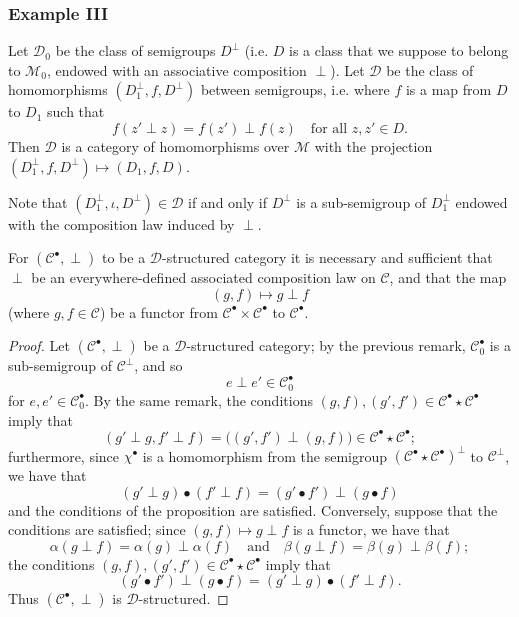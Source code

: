 \documentclass[a4paper,fleqn]{article}
\theoremstyle{plain}
\newenvironment{proposition}[1]
  {\renewcommand\theinnerproposition{#1}\innerproposition}
  {\endinnerproposition}
\theoremstyle{definition}
\newcommand{\textand}{\quad\text{and}\quad}
\newcommand{\CC}{\mathcal{C}}
\newcommand{\MM}{\mathcal{M}}
\newcommand{\DD}{\mathcal{D}}
\newcommand{\smallbullet}{\bullet}
\begin{document}
\subsubsection*{Example III}
\label{section:ii.3.iii}

Let $\DD_0$ be the class of semigroups $D^\perp$ (i.e. $D$ is a class that we suppose to belong to $\MM_0$, endowed with an associative composition $\perp$).
Let $\DD$ be the class of homomorphisms $(D_1^\perp,f,D^\perp)$ between semigroups, i.e. where $f$ is a map from $D$ to $D_1$ such that
\[
  f(z'\perp z)
  = f(z')\perp f(z)
  \quad\text{for all $z,z'\in D$.}
\]
Then $\DD$ is a category of homomorphisms over $\MM$ with the projection $(D_1^\perp,f,D^\perp)\mapsto(D_1,f,D)$.

Note that $(D_1^\perp,\iota,D^\perp)\in\DD$ if and only if $D^\perp$ is a sub-semigroup of $D_1^\perp$ endowed with the composition law induced by $\perp$.

\begin{proposition}{7}
\label{proposition:ii-7}
  For $(\CC^\smallbullet,\perp)$ to be a $\DD$-structured category it is necessary and sufficient that $\perp$ be an everywhere-defined associated composition law on $\CC$, and that the map
  \[
    (g,f)
    \longmapsto g\perp f
  \]
  (where $g,f\in\CC$) be a functor from $\CC^\smallbullet\times\CC^\smallbullet$ to $\CC^\smallbullet$.
\end{proposition}

\begin{proof}
  Let $(\CC^\smallbullet,\perp)$ be a $\DD$-structured category;
  by the previous remark, $\CC_0^\smallbullet$ is a sub-semigroup of $\CC^\perp$, and so
  \[
    e\perp e'
    \in\CC_0^\smallbullet
  \]
  for $e,e'\in\CC_0^\smallbullet$.
  By the same remark, the conditions $(g,f),(g',f')\in\CC^\smallbullet\star\CC^\smallbullet$ imply that
  \[
    (g'\perp g,f'\perp f)
    = \big(
      (g',f')\perp(g,f)
    \big)
    \in\CC^\smallbullet\star\CC^\smallbullet;
  \]
  furthermore, since $\chi^\smallbullet$ is a homomorphism from the semigroup $(\CC^\smallbullet\star\CC^\smallbullet)^\perp$ to $\CC^\perp$, we have that
  \[
    (g'\perp g)\smallbullet(f'\perp f)
    = (g'\smallbullet f')\perp(g\smallbullet f)
  \]
  and the conditions of the proposition are satisfied.
  Conversely, suppose that the conditions are satisfied;
  since $(g,f)\mapsto g\perp f$ is a functor, we have that
  \[
    \alpha(g\perp f)
    =\alpha(g)\perp\alpha(f)
    \textand
    \beta(g\perp f)
    =\beta(g)\perp\beta(f);
  \]
  the conditions $(g,f),(g',f')\in\CC^\smallbullet\star\CC^\smallbullet$ imply that
  \[
    (g'\smallbullet f')\perp(g\smallbullet f)
    = (g'\perp g)\smallbullet(f'\perp f).
  \]
  Thus $(\CC^\smallbullet,\perp)$ is $\DD$-structured.
\end{proof}
\end{document}
